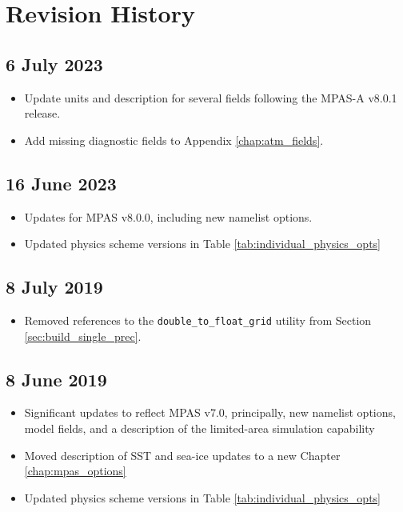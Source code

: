 
\chapter{Revision History}

\section*{6 July 2023}

\begin{itemize}
\item Update units and description for several fields following the MPAS-A v8.0.1 release.
\item Add missing diagnostic fields to Appendix \ref{chap:atm_fields}.
\end{itemize}

\section*{16 June 2023}

\begin{itemize}
\item Updates for MPAS v8.0.0, including new namelist options.
\item Updated physics scheme versions in Table \ref{tab:individual_physics_opts}
\end{itemize}

\section*{8 July 2019}

\begin{itemize}
\item Removed references to the {\tt double\_to\_float\_grid} utility from Section \ref{sec:build_single_prec}.
\end{itemize}

\section*{8 June 2019}

\begin{itemize}
\item Significant updates to reflect MPAS v7.0, principally, new namelist options, model fields, and a description of the
limited-area simulation capability
\item Moved description of SST and sea-ice updates to a new Chapter \ref{chap:mpas_options}
\item Updated physics scheme versions in Table \ref{tab:individual_physics_opts}
\end{itemize}

